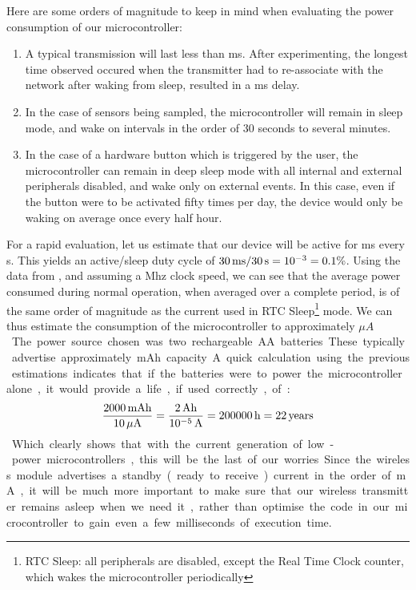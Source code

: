 Here are some orders of magnitude to keep in mind when evaluating the power
consumption of our microcontroller:
\begin{enumerate}
  \item A typical transmission will last less than \unit[20]{ms}. After
    experimenting, the longest time observed occured when the transmitter had to
    re-associate with the network after waking from sleep, resulted in a
    \unit[60]{ms} delay.
  \item In the case of sensors being sampled, the microcontroller will remain in
    sleep mode, and wake on intervals in the order of 30 seconds to several
    minutes. 
  \item In the case of a hardware button which is triggered by the user, the
    microcontroller can remain in deep sleep mode with all internal and external
    peripherals disabled, and wake only on external events. In this case, even
    if the button were to be activated fifty times per day, the device would
    only be waking on average once every half hour.
\end{enumerate}

For a rapid evaluation, let us estimate that our device will be active for
\unit[30]{ms} every \unit[30]{s}. This yields an active/sleep duty cycle of
$\unit[30]{ms}/\unit[30]{s}=10^{-3}=0.1\%$. Using the data from
, and assuming a \unit[2]{Mhz} clock speed, we can see
that the average power consumed during normal operation, when averaged over a
complete period, is of the same order of magnitude as the current used in RTC
Sleep\footnote{RTC Sleep: all peripherals are disabled, except the Real Time
Clock counter, which wakes the microcontroller periodically} mode. We can thus
estimate the consumption of the microcontroller to approximately
\unit[1-10]{$\mu{}A$}.

The power source chosen was two rechargeable AA batteries. These typically
advertise approximately \unit[2000]{mAh} capacity. A quick calculation using the
previous estimations indicates that if the batteries were to power the
microcontroller alone, it would provide a life, if used correctly, of:

\begin{equation}
  \frac{\unit[2000]{mAh}}{\unit[10]{\mu{}A}} = 
  \frac{\unit[2]{Ah}}{\unit[10^{-5}]{A}} =
  \unit[200000]{h} = \unit[22]{years}
  \label{eq:battery-life}
\end{equation}

Which clearly shows that with the current generation of low-power
microcontrollers, this will be the last of our worries. Since the wireless
module advertises a standby (ready to receive) current in the order of
\unit[50]{mA}, it will be much more important to make sure that our wireless
transmitter remains asleep when we need it, rather than optimise the code in our
microcontroller to gain even a few milliseconds of execution time.

